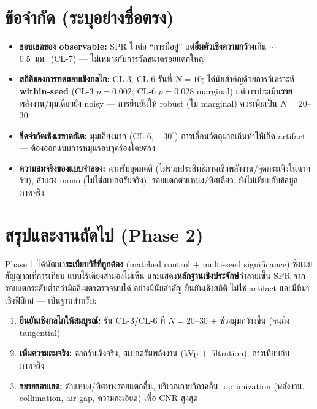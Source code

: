 \documentclass[14pt]{extarticle}
\begin{document}
\section{ข้อจำกัด (ระบุอย่างซื่อตรง)}
\begin{itemize}
  \item \textbf{ขอบเขตของ observable:} SPR ไวต่อ ``การมีอยู่'' แต่\textbf{อิ่มตัวเชิงความกว้าง}เกิน $\sim$0.5~มม.\ (CL-7)
        --- ไม่เหมาะกับการวัดขนาดรอยแตกใหญ่
  \item \textbf{สถิติของการทดสอบเชิงกลไก:} CL-3, CL-6 รันที่ $N=10$; ได้นัยสำคัญด้วยการวิเคราะห์ \textbf{within-seed}
        (CL-3 $p=0.002$; CL-6 $p=0.028$ marginal) แต่การประเมิน\textbf{ราย}พลังงาน/มุมเดี่ยวยัง noisy ---
        การยืนยันให้ robust (ไม่ marginal) ควรเพิ่มเป็น $N=20$--$30$
  \item \textbf{ขีดจำกัดเชิงเรขาคณิต:} มุมเอียงมาก (CL-6, $-30^\circ$) การเลื่อนวัตถุมากเกินทำให้เกิด artifact ---
        ต้องออกแบบการหมุนรอบจุดร่องโดยตรง
  \item \textbf{ความสมจริงของแบบจำลอง:} ฉากรับอุดมคติ (ไม่รวมประสิทธิภาพเชิงพลังงาน/จุดกระเจิงในฉากรับ),
        ลำแสง mono (ไม่ใช่สเปกตรัมจริง), รอยแตกตำแหน่ง/ทิศเดียว, ยังไม่เทียบกับข้อมูลภาพจริง
\end{itemize}

\section{สรุปและงานถัดไป (Phase 2)}
Phase 1 ได้พัฒนา\textbf{ระเบียบวิธีที่ถูกต้อง} (matched control + multi-seed significance) ซึ่งเผยสัญญาณที่การเทียบ
แบบไร้เดียงสามองไม่เห็น และแสดง\textbf{หลักฐานเชิงประจักษ์}ว่าลายเซ็น SPR จากรอยแตกระดับต่ำกว่ามิลลิเมตรตรวจพบได้
อย่างมีนัยสำคัญ ยืนยันเชิงสถิติ ไม่ใช่ artifact และมีที่มาเชิงฟิสิกส์ --- เป็นฐานสำหรับ:
\begin{enumerate}
  \item \textbf{ยืนยันเชิงกลไกให้สมบูรณ์:} รัน CL-3/CL-6 ที่ $N=20$--$30$ + ช่วงมุมกว้างขึ้น (จนถึง tangential)
  \item \textbf{เพิ่มความสมจริง:} ฉากรับเชิงจริง, สเปกตรัมพลังงาน (kVp + filtration), การเทียบกับภาพจริง
  \item \textbf{ขยายขอบเขต:} ตำแหน่ง/ทิศทางรอยแตกอื่น, บริเวณกายวิภาคอื่น, optimization (พลังงาน, collimation,
        air-gap, ความละเอียด) เพื่อ CNR สูงสุด
\end{enumerate}

\appendix
\end{document}
